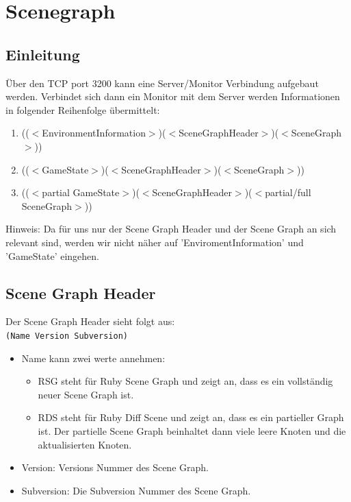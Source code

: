 \section*{Scenegraph}
\subsection*{Einleitung}
Über den TCP port 3200 kann eine Server/Monitor Verbindung aufgebaut 
werden. Verbindet sich dann ein Monitor mit dem Server werden 
Informationen in folgender Reihenfolge übermittelt:

\begin{enumerate}
\item  (($<$EnvironmentInformation$>$)($<$SceneGraphHeader$>$)($<$SceneGraph$>$))
\item  (($<$GameState$>$)($<$SceneGraphHeader$>$)($<$SceneGraph$>$))
\item  (($<$partial GameState$>$)($<$SceneGraphHeader$>$)($<$partial/full SceneGraph$>$))
\end{enumerate}
Hinweis: Da für uns nur der Scene Graph Header und der Scene Graph an
 sich relevant sind, werden wir nicht näher auf 'EnviromentInformation' 
und 'GameState' eingehen.

\subsection*{Scene Graph Header}
Der Scene Graph Header sieht folgt aus:\\
\texttt{(Name Version Subversion)}

\begin{itemize}
\item  Name kann zwei werte annehmen:
\begin{itemize}
	\item  RSG steht für Ruby Scene Graph und zeigt an, dass es ein vollständig neuer Scene Graph ist.
	\item  RDS steht für Ruby Diff Scene und zeigt an, dass es ein 
	partieller Graph ist. Der partielle Scene Graph beinhaltet dann viele 
	leere Knoten und die aktualisierten Knoten.
\end{itemize}
\item  Version: Versions Nummer des Scene Graph.
\item  Subversion: Die Subversion Nummer des Scene Graph.
\end{itemize}
